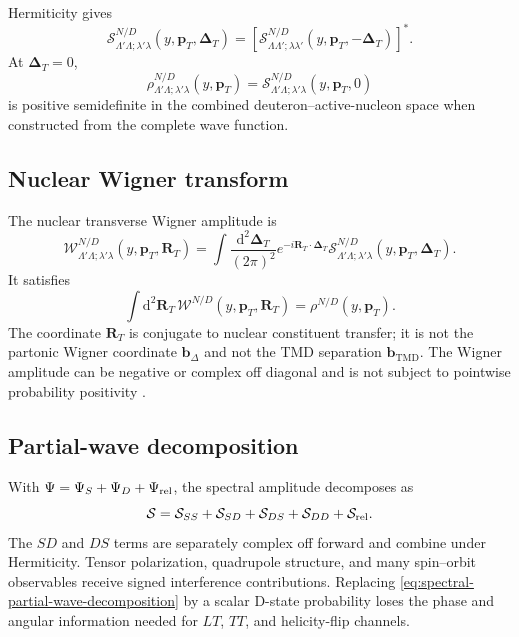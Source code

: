 \documentclass[11pt]{article}
\newcommand{\pT}{\bm{p}_{T}}
\newcommand{\DT}{\bm{\Delta}_{T}}
\newcommand{\bD}{\bm{b}_{\Delta}}
\newcommand{\bM}{\bm{b}_{\mathrm{TMD}}}
\newcommand{\RT}{\bm{R}_{T}}
\newcommand{\dd}{\mathrm{d}}
\newcommand{\cS}{\mathcal S}
\newcommand{\cW}{\mathcal W}
\begin{document}
Hermiticity gives
\begin{equation}
 \cS_{\Lambda'\Lambda;\lambda'\lambda}^{N/D}
 (y,\pT,\DT)
 =
 \left[
 \cS_{\Lambda\Lambda';\lambda\lambda'}^{N/D}
 (y,\pT,-\DT)
 \right]^*.
\label{eq:spectral-hermiticity}
\end{equation}
At \(\DT=0\),
\begin{equation}
 \rho_{\Lambda'\Lambda;\lambda'\lambda}^{N/D}(y,\pT)
 =\cS_{\Lambda'\Lambda;\lambda'\lambda}^{N/D}(y,\pT,0)
\label{eq:forward-spectral-density}
\end{equation}
is positive semidefinite in the combined deuteron--active-nucleon space when
constructed from the complete wave function.

\subsection{Nuclear Wigner transform}

The nuclear transverse Wigner amplitude is
\begin{equation}
 \cW_{\Lambda'\Lambda;\lambda'\lambda}^{N/D}
 (y,\pT,\RT)
 =\int\frac{\dd^2\DT}{(2\pi)^2}
 e^{-i\RT\cdot\DT}
 \cS_{\Lambda'\Lambda;\lambda'\lambda}^{N/D}(y,\pT,\DT).
\label{eq:nuclear-wigner-transform}
\end{equation}
It satisfies
\begin{equation}
 \int\dd^2\RT\,
 \cW^{N/D}(y,\pT,\RT)
 =\rho^{N/D}(y,\pT).
\label{eq:nuclear-wigner-marginal}
\end{equation}
The coordinate \(\RT\) is conjugate to nuclear constituent transfer; it is
not the partonic Wigner coordinate \(\bD\) and not the TMD separation
\(\bM\).  The Wigner amplitude can be negative or complex off diagonal and is
not subject to pointwise probability positivity
\cite{NeffFeldmeier2016}.

\subsection{Partial-wave decomposition}

With \(\Psi=\Psi_S+\Psi_D+\Psi_{\rm rel}\), the spectral amplitude decomposes
as
\begin{equation}
 \cS=\cS_{SS}+\cS_{SD}+\cS_{DS}+\cS_{DD}
 +\cS_{\rm rel}.
\label{eq:spectral-partial-wave-decomposition}
\end{equation}
The \(SD\) and \(DS\) terms are separately complex off forward and combine
under Hermiticity.  Tensor polarization, quadrupole structure, and many
spin--orbit observables receive signed interference contributions.  Replacing
\cref{eq:spectral-partial-wave-decomposition} by a scalar D-state probability
loses the phase and angular information needed for \(LT\), \(TT\), and
helicity-flip channels.
\end{document}
